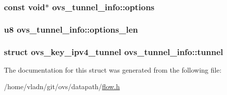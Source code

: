 \subsubsection[{options}]{\setlength{\rightskip}{0pt plus 5cm}const void$\ast$ ovs\+\_\+tunnel\+\_\+info\+::options}\label{structovs__tunnel__info_ae4fd786894f579a38a5955e7a0e68fd4}
\hypertarget{structovs__tunnel__info_ab50d289f61727b922831739affb28b18}{}
\subsubsection[{options\+\_\+len}]{\setlength{\rightskip}{0pt plus 5cm}u8 ovs\+\_\+tunnel\+\_\+info\+::options\+\_\+len}\label{structovs__tunnel__info_ab50d289f61727b922831739affb28b18}
\hypertarget{structovs__tunnel__info_a007f0c7a9938884e6e8663cb4ab20d10}{}
\subsubsection[{tunnel}]{\setlength{\rightskip}{0pt plus 5cm}struct {\bf ovs\+\_\+key\+\_\+ipv4\+\_\+tunnel} ovs\+\_\+tunnel\+\_\+info\+::tunnel}\label{structovs__tunnel__info_a007f0c7a9938884e6e8663cb4ab20d10}


The documentation for this struct was generated from the following file\+:\begin{DoxyCompactItemize}
\item 
/home/vladn/git/ovs/datapath/\hyperlink{flow_8h}{flow.\+h}\end{DoxyCompactItemize}
